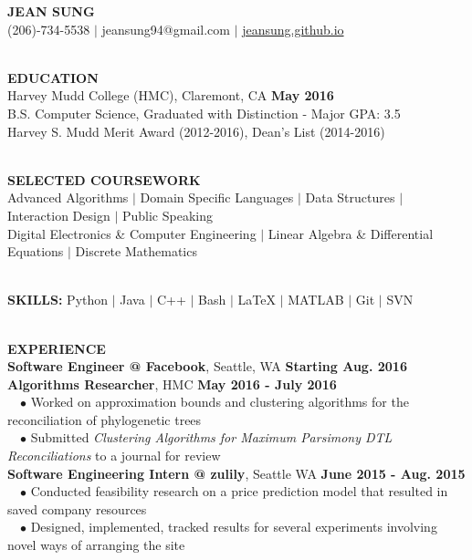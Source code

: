 \documentclass[11pt]{article}
\makeatletter
\newcommand{\selfName}{\textbf{\fontsize{30}{30}\selectfont JEAN SUNG }}
\newcommand{\email}{\large {jeansung94@gmail.com }}
\newcommand{\phone}{\large (206)-734-5538 }
\newcommand{\websitedisplaytext}{\large jeansung.github.io }
\newcommand{\website}{\href{http://jeansung.github.io}{\websitedisplaytext}}
\newcommand{\wrapTitle}[1]{{\textbf{\sectionNL \Large #1}} \sectionNL}
\newcommand{\vb}{ $\mid$ }
\newcommand{\sectionNL}{~\\[0.5pt]}
\newcommand{\customtab}{$\hspace{10pt} \bullet \hspace{2pt}$}
\newcommand{\HMC}{HMC}
\newcommand{\rightAlign}{\hfill}
\makeatother
\begin{document}
\begin{center}
\selfName\\
\phone  
\vb\email 
\vb\website \\
\hrulefill
\end{center}


\begin{flushleft}
\wrapTitle{EDUCATION}
Harvey Mudd College (\HMC), Claremont, CA \rightAlign \textbf{May 2016 } \\
B.S. Computer Science, Graduated with Distinction - Major GPA: 3.5 \\
Harvey S. Mudd Merit Award (2012-2016), Dean's List (2014-2016)
\end{flushleft}

\begin{flushleft}
\wrapTitle{SELECTED COURSEWORK}
Advanced Algorithms
\vb Domain Specific Languages 
\vb Data Structures  
\vb Interaction Design
\vb Public Speaking \\
Digital Electronics \& Computer Engineering
\vb Linear Algebra \& Differential Equations  
\vb Discrete Mathematics
\end{flushleft}

\begin{flushleft}
{\sectionNL \Large \textbf{SKILLS:}}
Python 
\vb Java 
\vb C++
\vb Bash
\vb \LaTeX
\vb MATLAB
\vb Git
\vb SVN
\end{flushleft}

\begin{flushleft}
\wrapTitle{EXPERIENCE}
\textbf{Software Engineer @ Facebook}, Seattle, WA \rightAlign \textbf{Starting Aug. 2016} \\
\textbf{Algorithms Researcher}, HMC \rightAlign \textbf{May 2016 - July 2016} \\
\customtab Worked on approximation bounds and clustering algorithms for the reconciliation of phylogenetic trees \\
\customtab Submitted \textit{Clustering Algorithms for Maximum Parsimony DTL Reconciliations} to  a journal for review  \\
\textbf{Software Engineering Intern @ zulily}, Seattle WA \rightAlign \textbf{June 2015 - Aug. 2015} \\
\customtab Conducted feasibility research on a price prediction model that resulted in saved company resources \\
\customtab Designed, implemented, tracked results for several experiments involving novel ways of arranging the site \\
\end{flushleft}
\end{document}
